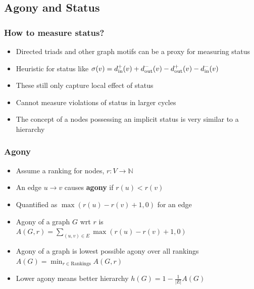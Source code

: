 \documentclass{beamer}
\begin{document}
\subsection{Agony and Status}

\begin{frame}
    \frametitle{How to measure status?}
    \begin{itemize}
        \item Directed triads and other graph motifs can be a proxy for measuring status \cite{Liu2019LinkPrediction}
        \item Heuristic for status like  $\sigma(v) = d_{\text{in}}^{+}(v) + d_{\text{out}}^{-}(v) - d_{\text{out}}^{+}(v)- d_{\text{in}}^{-}(v)$ \cite{leskovec2010predicting}
        \item These still only capture local effect of status
        \item Cannot measure violations of status in larger cycles
        \item The concept of a nodes possessing an implicit status is very similar to a hierarchy
    \end{itemize}
\end{frame}

\begin{frame}
    \frametitle{Agony}
    \begin{itemize}
        \item Assume a ranking for nodes, $r:V\rightarrow \mathbb{N}$
        \item An edge $u \rightarrow v$ causes \textbf{agony} if $r(u)<r(v)$
        \item Quantified as $\max(r(u)-r(v)+1,0)$ for an edge
        \item Agony of a graph $G$ wrt $r$ is $A(G,r) =  \sum_{(u,v)\in E} \max(r(u)-r(v)+1,0)$
        \item Agony of a graph is lowest possible agony over all rankings $A(G) = \min_{r\in \text{Rankings}}A(G,r)$
        \item Lower agony means better hierarchy $h(G)=1-\frac{1}{|E|}A(G)$
    \end{itemize}
\end{frame}
\end{document}
